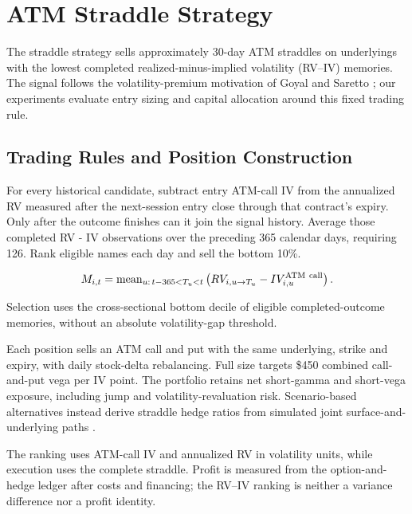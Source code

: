 \section{ATM Straddle Strategy}\label{sec:5}

The straddle strategy sells approximately 30-day ATM straddles on underlyings with the lowest completed realized-minus-implied volatility (RV--IV) memories. The signal follows the volatility-premium motivation of Goyal and Saretto \cite{goyal2009}; our experiments evaluate entry sizing and capital allocation around this fixed trading rule.


\subsection{Trading Rules and Position Construction}

For every historical candidate, subtract entry ATM-call IV from the annualized RV measured after the next-session entry close through that contract's expiry. Only after the outcome finishes can it join the signal history. Average those completed RV - IV observations over the preceding 365 calendar days, requiring 126. Rank eligible names each day and sell the bottom 10\%.


\begin{equation*}M_{i,t}=\operatorname{mean}_{u:\,t-365<T_u<t}\left(RV_{i,u\to T_u}-IV^{\rm ATM\ call}_{i,u}\right).\end{equation*}

Selection uses the cross-sectional bottom decile of eligible completed-outcome memories, without an absolute volatility-gap threshold.



Each position sells an ATM call and put with the same underlying, strike and expiry, with daily stock-delta rebalancing. Full size targets \$450 combined call-and-put vega per IV point. The portfolio retains net short-gamma and short-vega exposure, including jump and volatility-revaluation risk. Scenario-based alternatives instead derive straddle hedge ratios from simulated joint surface-and-underlying paths \cite{vuletic2025volgan}.




The ranking uses ATM-call IV and annualized RV in volatility units, while execution uses the complete straddle. Profit is measured from the option-and-hedge ledger after costs and financing; the RV--IV ranking is neither a variance difference nor a profit identity.




